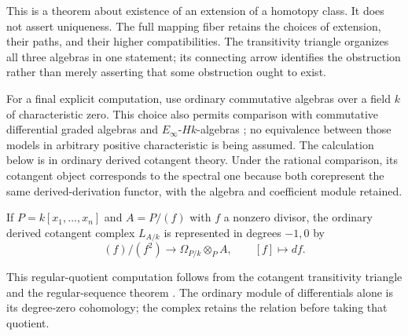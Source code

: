 This is a theorem about existence of an extension of a homotopy class.
It does not assert uniqueness.  The full mapping fiber retains the
choices of extension, their paths, and their higher compatibilities.
The transitivity triangle organizes all three algebras in one statement;
its connecting arrow identifies the obstruction rather than merely
asserting that some obstruction ought to exist.

For a final explicit computation, use ordinary commutative algebras over
a field $k$ of characteristic zero.  This choice also permits comparison
with commutative differential graded algebras and $E_\infty$-$Hk$-algebras
\cite[Proposition 7.1.4.11]{HA}; no equivalence between those models in
arbitrary positive characteristic is being assumed. The calculation below
is in ordinary derived cotangent theory. Under the rational comparison,
its cotangent object corresponds to the spectral one because both
corepresent the same derived-derivation functor, with the algebra and
coefficient module retained.

\begin{theorem}
\label{t:hypersurface-input}
If $P=k[x_1,\ldots,x_n]$ and $A=P/(f)$ with $f$ a nonzero divisor,
the ordinary derived cotangent complex $L_{A/k}$ is represented in
degrees $-1,0$ by
\[
 (f)/(f^2)\longrightarrow\Omega_{P/k}\otimes_P A,
 \qquad [f]\longmapsto df.
\]
\end{theorem}
This regular-quotient computation follows from the cotangent
transitivity triangle and the regular-sequence theorem
\cite[Tags 08SH, 08QX]{Stacks}.  The ordinary module of differentials
alone is its degree-zero cohomology; the complex retains the relation
before taking that quotient.

